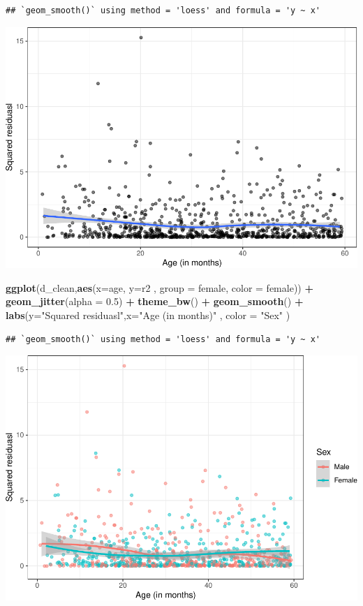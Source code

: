 \documentclass[
]{article}
\newenvironment{Shaded}{\begin{snugshade}}{\end{snugshade}}
\newcommand{\AttributeTok}[1]{\textcolor[rgb]{0.13,0.29,0.53}{#1}}
\newcommand{\FloatTok}[1]{\textcolor[rgb]{0.00,0.00,0.81}{#1}}
\newcommand{\FunctionTok}[1]{\textcolor[rgb]{0.13,0.29,0.53}{\textbf{#1}}}
\newcommand{\NormalTok}[1]{#1}
\newcommand{\SpecialCharTok}[1]{\textcolor[rgb]{0.81,0.36,0.00}{\textbf{#1}}}
\newcommand{\StringTok}[1]{\textcolor[rgb]{0.31,0.60,0.02}{#1}}
\begin{document}
\begin{verbatim}
## `geom_smooth()` using method = 'loess' and formula = 'y ~ x'
\end{verbatim}

\includegraphics{ProblemSet3_Siyu_Zou_files/figure-latex/unnamed-chunk-10-1.pdf}

\begin{Shaded}
\begin{Highlighting}[]
\FunctionTok{ggplot}\NormalTok{(d\_clean,}\FunctionTok{aes}\NormalTok{(}\AttributeTok{x=}\NormalTok{age, }\AttributeTok{y=}\NormalTok{r2 , }\AttributeTok{group =}\NormalTok{ female, }\AttributeTok{color =}\NormalTok{ female)) }\SpecialCharTok{+}
    \FunctionTok{geom\_jitter}\NormalTok{(}\AttributeTok{alpha =} \FloatTok{0.5}\NormalTok{) }\SpecialCharTok{+}
    \FunctionTok{theme\_bw}\NormalTok{() }\SpecialCharTok{+}
    \FunctionTok{geom\_smooth}\NormalTok{() }\SpecialCharTok{+}
    \FunctionTok{labs}\NormalTok{(}\AttributeTok{y=}\StringTok{"Squared residuasl"}\NormalTok{,}\AttributeTok{x=}\StringTok{"Age (in months)"}\NormalTok{ , }\AttributeTok{color =} \StringTok{"Sex"}\NormalTok{ )}
\end{Highlighting}
\end{Shaded}

\begin{verbatim}
## `geom_smooth()` using method = 'loess' and formula = 'y ~ x'
\end{verbatim}

\includegraphics{ProblemSet3_Siyu_Zou_files/figure-latex/unnamed-chunk-11-1.pdf}
\end{document}
